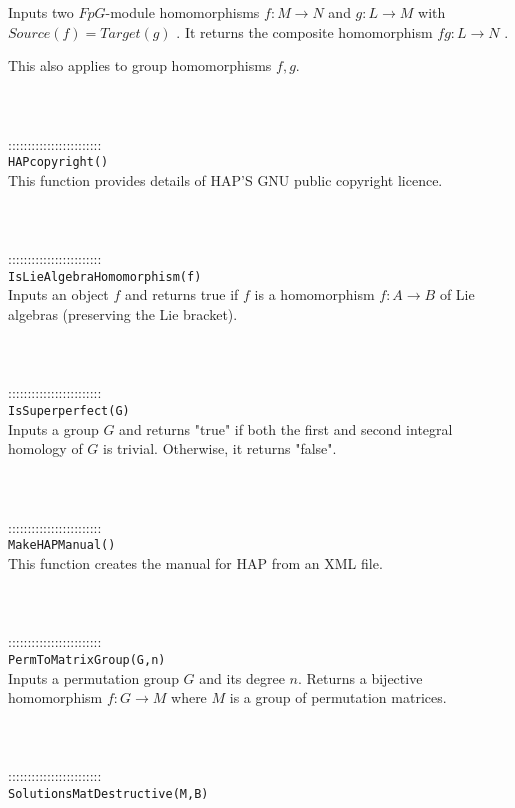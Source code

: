 \documentclass[a4paper,11pt]{report}
\begin{document}
{ Inputs two $FpG$-module homomorphisms $ f:M \longrightarrow N$ and $g:L \longrightarrow M$ with $Source(f)=Target(g)$ . It returns the composite homomorphism $fg:L \longrightarrow N$ . 

 This also applies to group homomorphisms $f,g$. \\
 \\
 \\
 \\
 ::::::::::::::::::::::::\\
 \texttt{HAPcopyright() }\\
 

 This function provides details of HAP'S GNU public copyright licence. \\
 \\
 \\
 \\
 ::::::::::::::::::::::::\\
 \texttt{IsLieAlgebraHomomorphism(f) }\\
 

 Inputs an object $f$ and returns true if $f$ is a homomorphism $f:A \longrightarrow B$ of Lie algebras (preserving the Lie bracket). \\
 \\
 \\
 \\
 ::::::::::::::::::::::::\\
 \texttt{IsSuperperfect(G) }\\
 

 Inputs a group $G$ and returns "true" if both the first and second integral homology of $G$ is trivial. Otherwise, it returns "false". \\
 \\
 \\
 \\
 ::::::::::::::::::::::::\\
 \texttt{MakeHAPManual()}\\
 

 This function creates the manual for HAP from an XML file. \\
 \\
 \\
 \\
 ::::::::::::::::::::::::\\
 \texttt{PermToMatrixGroup(G,n) }\\
 

 Inputs a permutation group $G$ and its degree $n$. Returns a bijective homomorphism $f:G \longrightarrow M$ where $M$ is a group of permutation matrices. \\
 \\
 \\
 \\
 ::::::::::::::::::::::::\\
 \texttt{SolutionsMatDestructive(M,B) }\\
 

}
\end{document}

